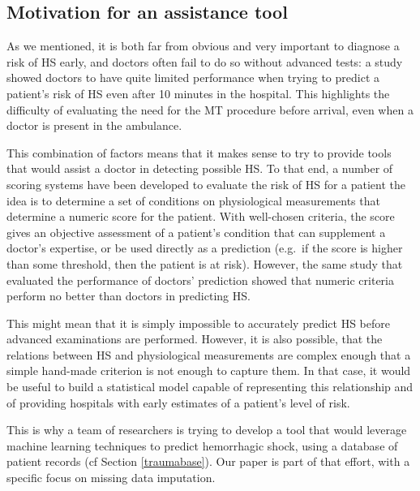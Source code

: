 		\subsection{Motivation for an assistance tool}

As we mentioned, it is both far from obvious and very important to diagnose a risk of HS early, and doctors often fail to do so without advanced tests: a study \cite{pommerening2015gestalt} showed doctors to have quite limited performance when trying to predict a patient's risk of HS even after 10 minutes in the hospital. This highlights the difficulty of evaluating the need for the MT procedure before arrival, even when a doctor is present in the ambulance.

This combination of factors means that it makes sense to try to provide tools that would assist a doctor in detecting possible HS. To that end, a number of scoring systems have been developed to evaluate the risk of HS for a patient \cite{nunez2009ABC} \cite{gonzalez2016resussitation_outcome} \cite{maegele2011TASH} \cite{hamada2018redflag} the idea is to determine a set of conditions on physiological measurements that determine a numeric score for the patient. With well-chosen criteria, the score gives an objective assessment of a patient's condition that can supplement a doctor's expertise, or be used directly as a prediction (e.g.\ if the score is higher than some threshold, then the patient is at risk). However, the same study that evaluated the performance of doctors' prediction \cite{pommerening2015gestalt} showed that numeric criteria perform no better than doctors in predicting HS.

This might mean that it is simply impossible to accurately predict HS before advanced examinations are performed. However, it is also possible, that the relations between HS and physiological measurements are complex enough that a simple hand-made criterion is not enough to capture them. In that case, it would be useful to build a statistical model capable of representing this relationship and of providing hospitals with early estimates of a patient's level of risk. 

This is why a team of researchers is trying to develop a tool that would leverage machine learning techniques to predict hemorrhagic shock, using a database of patient records (cf Section \ref{traumabase}). Our paper is part of that effort, with a specific focus on missing data imputation.


